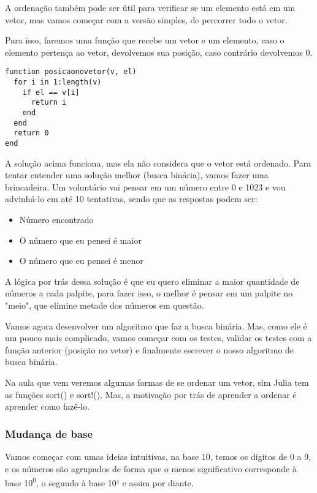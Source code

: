\documentclass[a4paper]{article}
\begin{document}
A ordenação também pode ser útil para verificar se um elemento está em
um vetor, mas vamos começar com a versão simples, de percorrer todo o vetor.

Para isso, faremos uma função que recebe um vetor e um elemento, caso o
elemento pertença ao vetor, devolvemos sua posição, caso contrário devolvemos 0.


\lstset{language=ein-julia,label= ,caption= ,captionpos=b,numbers=none}
\begin{lstlisting}
function posicaonovetor(v, el)
  for i in 1:length(v)
    if el == v[i]
      return i
    end
  end
  return 0
end
\end{lstlisting}

A solução acima funciona, mas ela não considera que o vetor está ordenado.
Para tentar entender uma solução melhor (busca binária), vamos fazer uma
brincadeira. Um voluntário vai pensar em um número entre 0 e 1023 e vou
advinhá-lo em até 10 tentativas, sendo que as respostas podem ser:
\begin{itemize}
\item Número encontrado
\item O número que eu pensei é maior
\item O número que eu pensei é menor
\end{itemize}

A lógica por trás dessa solução é que eu quero eliminar a maior quantidade
de números a cada palpite, para fazer isso, o melhor é pensar em um
palpite no "meio", que elimine metade dos números em questão.

Vamos agora desenvolver um algoritmo que faz a busca binária.
Mas, como ele é um pouco mais complicado, vamos começar com os testes,
validar os testes com a função anterior (posição no vetor) e finalmente
escrever o nosso algoritmo de busca binária.

Na aula que vem veremos algumas formas de se ordenar um vetor,
sim Julia tem as funções sort() e sort!(). Mas, a motivação por
trás de aprender a ordenar é aprender como fazê-lo.

\subsubsection{Mudança de base}
\label{sec:org7b0540b}
Vamos começar com umas ideias intuitivas, na base 10, temos os
dígitos de 0 a 9, e os números são agrupados de forma que o menos
significativo corresponde à base 10\textsuperscript{0}, o segundo à base 10¹ e assim
por diante.
\end{document}
